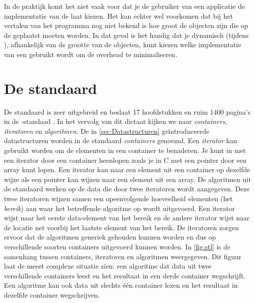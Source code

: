 \begin{cpplstShortInline}

In de praktijk komt het niet vaak voor dat je de gebruiker van een applicatie de implementatie van de  laat kiezen.
Het kan echter wel voorkomen dat bij het vertalen van het programma nog niet bekend is hoe groot de objecten zijn die op de  geplaatst moeten worden.
In dat geval is het handig dat je dynamisch (tijdens ), afhankelijk van de grootte van de objecten, kunt kiezen welke implementatie van een  gebruikt wordt om de overhead te minimaliseren.

\chapter[De standaard C++ \USE{library}]{De standaard \Cpp{} }
\label{sec:stdlib}
De standaard \Cpp{}  is zeer uitgebreid en beslaat 17 hoofdstukken en ruim 1400 pagina's in de \Cpp{}\hyp{}standaad \cite{ISO2023}. 
In het vervolg van dit dictaat kijken we naar \emph{containers}, \emph{iteratoren} en \emph{algoritmen}.
De in \cref{sec:Datastructuren} geïntroduceerde datastructuren worden in de standaard \Cpp{}  \emph{containers} genoemd.
Een \emph{iterator} kan gebruikt worden om de elementen in een container te benaderen.
Je kunt in \Cpp{} met een iterator door een container heenlopen zoals je in C met een pointer door een array kunt lopen.
Een iterator kan  naar een element uit een container op dezelfde wijze als een pointer kan wijzen naar een element uit een array.
De algoritmen uit de standaard  werken op de data die door twee iteratoren wordt aangegeven.
Deze twee iteratoren wijzen samen een opeenvolgende hoeveelheid elementen (het \emph{bereik}) aan waar het betreffende algoritme op wordt uitgevoerd.
Een iterator wijst naar het eerste data\hyp{}element van het bereik en de andere iterator wijst naar de locatie net voorbij het laatste element van het bereik.
De iteratoren zorgen ervoor dat de algoritmen generiek gehouden kunnen worden en dus op verschillende soorten containers uitgevoerd kunnen worden.
In \cref{fig:stl} is de samenhang tussen containers, iteratoren en algoritmen weergegeven.
Dit figuur laat de meest complexe situatie zien: een algoritme dat data uit twee verschillende containers leest en het resultaat in een derde container wegschrijft.
Een algoritme kan ook data uit slechts één container lezen en het resultaat in dezelfde container wegschrijven.


\end{cpplstShortInline}
